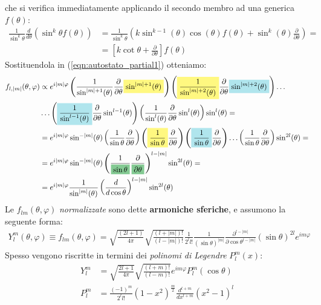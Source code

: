 \documentclass[../../FisicaTeorica.tex]{subfiles}
\begin{document}
che si verifica immediatamente applicando il secondo membro ad una generica $f(\theta)$:
\begin{align*}
\frac{1}{\sin^k \theta}\frac{d}{d\theta}(\sin^k \theta f(\theta)) &= \frac{1}{\sin^k\theta}\left(k\sin^{k-1}(\theta)\cos(\theta)f(\theta) + \sin^k(\theta)\frac{\partial}{\partial \theta}\right) =\\
&=\left[k\cot\theta +\frac{\partial}{\partial \theta}\right]f(\theta)
\end{align*}
Sostituendola in (\ref{eqn:autostato_partial1}) otteniamo:
\begin{align*}
f_{l,|m|}(\theta,\varphi) &\propto e^{i|m|\varphi} \left(\frac{1}{\sin^{|m|+1}(\theta)}\frac{\partial}{\partial \theta}\hlc{Yellow}{\sin^{|m|+1}(\theta)}\right)\left(\hlc{Yellow}{\frac{1}{\sin^{|m|+2}(\theta)}}\frac{\partial}{\partial \theta}\hlc{SkyBlue}{\sin^{|m|+2}(\theta)}\right) \dots\\
&\dots\left(\hlc{SkyBlue}{\frac{1}{\sin^{l-1}(\theta)}}\frac{\partial}{\partial \theta} \sin^{l-1}(\theta)\right)\left(\frac{1}{\sin^l(\theta)}\frac{\partial}{\partial \theta}\sin^l(\theta)\right) \sin^l(\theta) =\\
&=e^{i|m|\varphi} \sin^{-|m|}(\theta)\left( \frac{1}{\sin\theta}\frac{\partial}{\partial \theta}\right)\left( \hlc{Yellow}{\frac{1}{\sin\theta}}\frac{\partial}{\partial \theta}\right)\left(\hlc{SkyBlue}{\frac{1}{\sin\theta}}\frac{\partial}{\partial \theta}\right)\dots\left(\frac{1}{\sin\theta}\frac{\partial}{\partial\theta}\right)\sin^{2l}(\theta)=\\
&=e^{i|m|\varphi}\sin^{-|m|}(\theta)\left(\frac{1}{\hlc{ForestGreen}{\sin\theta}}\frac{\partial}{\hlc{ForestGreen}{\partial \theta}}\right)^{l-|m|}\sin^{2l}(\theta) =\\
&=e^{i|m|\varphi}\frac{1}{\sin^{|m|}(\theta)}\left(\frac{d}{d\cos\theta}\right)^{l-|m|}\sin^{2l}(\theta)
\end{align*}
Le $f_{lm}(\theta,\varphi)$ \textit{normalizzate} sono dette \textbf{armoniche sferiche}, e assumono la seguente forma:
\begin{align*}
Y_l^m(\theta,\varphi)\equiv f_{lm}(\theta,\varphi)=\sqrt{\frac{(2l+1)}{4\pi}} \sqrt{\frac{(l+|m|)!}{(l-|m|)!}}\frac{1}{2^l l!} \frac{1}{(\sin\theta)^{|m|}} \frac{\partial^{l-|m|}}{\partial \cos\theta^{l-|m|}} (\sin\theta)^{2l} e^{im\varphi}
\end{align*}
Spesso vengono riscritte in termini dei \textit{polinomi di Legendre} $P_l^m(x)$:
\begin{align*}
Y^m_l&=\sqrt{\frac{2l+1}{4\pi}}\sqrt{\frac{(l+m)!}{(l-m)!}}e^{im\varphi}P_l^m(\cos\theta)\\
P_l^m &=\frac{(-1)^m}{2^l l!}(1-x^2)^\frac{m}{2} \frac{d^{l+m}}{dx^{l+m}}(x^2-1)^l
\end{align*}
\end{document}
